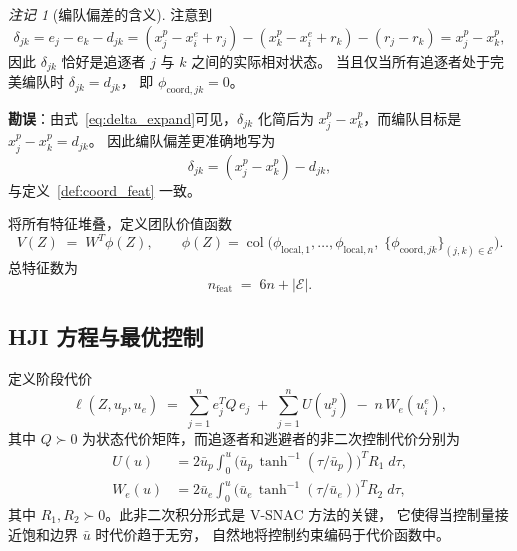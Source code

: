 \documentclass[a4paper,11pt]{article}
\theoremstyle{plain}
\theoremstyle{definition}
\theoremstyle{remark}
\newtheorem{remark}[theorem]{注记}
\DeclareMathOperator{\col}{col}
\newcommand{\cE}{\mathcal{E}}
\newcommand{\abs}[1]{\lvert #1 \rvert}
\begin{document}
\begin{remark}[编队偏差的含义]\label{rmk:delta}
  注意到
  \begin{equation}\label{eq:delta_expand}
    \delta_{jk} = e_j - e_k - d_{jk}
    = (x_j^p - x_i^e + r_j) - (x_k^p - x_i^e + r_k) - (r_j - r_k)
    = x_j^p - x_k^p,
  \end{equation}
  因此 $\delta_{jk}$ 恰好是追逐者 $j$ 与 $k$ 之间的实际相对状态。
  当且仅当所有追逐者处于完美编队时 $\delta_{jk} = d_{jk}$，
  即 $\phi_{\text{coord},jk} = 0$。

  {\bfseries 勘误}：由式~\eqref{eq:delta_expand}可见，$\delta_{jk}$
  化简后为 $x_j^p - x_k^p$，而编队目标是 $x_j^p - x_k^p = d_{jk}$。
  因此编队偏差更准确地写为
  \begin{equation}\label{eq:delta_correct}
    \delta_{jk} = (x_j^p - x_k^p) - d_{jk},
  \end{equation}
  与定义~\ref{def:coord_feat} 一致。
\end{remark}

将所有特征堆叠，定义团队价值函数
\begin{equation}\label{eq:V_new}
  V(Z) \;=\; W^T \phi(Z), \qquad
  \phi(Z) = \col\!\bigl(\phi_{\text{local},1},\dots,\phi_{\text{local},n},\;
  \{\phi_{\text{coord},jk}\}_{(j,k)\in\cE}\bigr).
\end{equation}
总特征数为
\begin{equation}\label{eq:n_feat}
  n_{\text{feat}} \;=\; 6n + \abs{\cE}.
\end{equation}

\subsection{HJI 方程与最优控制}\label{subsec:HJI}

定义阶段代价
\begin{equation}\label{eq:stage_cost}
  \ell(Z, u_p, u_e)
  \;=\; \sum_{j=1}^{n} e_j^T Q\, e_j
  \;+\; \sum_{j=1}^{n} U(u_j^p)
  \;-\; n\, W_e(u_i^e),
\end{equation}
其中 $Q \succ 0$ 为状态代价矩阵，而追逐者和逃避者的非二次控制代价分别为
\begin{align}
  U(u) &= 2\bar{u}_p \int_0^{u}
    \bigl(\bar{u}_p\, \tanh^{-1}(\tau / \bar{u}_p)\bigr)^T R_1\; d\tau,
    \label{eq:U_cost}\\
  W_e(u) &= 2\bar{u}_e \int_0^{u}
    \bigl(\bar{u}_e\, \tanh^{-1}(\tau / \bar{u}_e)\bigr)^T R_2\; d\tau,
    \label{eq:W_cost}
\end{align}
其中 $R_1, R_2 \succ 0$。此非二次积分形式是 V-SNAC 方法的关键，
它使得当控制量接近饱和边界 $\bar{u}$ 时代价趋于无穷，
自然地将控制约束编码于代价函数中。
\end{document}
